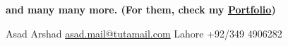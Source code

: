 \documentclass[lighthipster]{simplehipstercv}
\newlength{\rightcolwidth}
\begin{document}
\begin{paracol}{2}
\begin{tabular}{r| p{} c}
\end{tabular}

\begin{center}
    \small
    \textbf{and many many more. (For them, check my \href{https://def-fun7.github.io/Portfolio/}{Portfolio}) }
\end{center}
\vspace{2em}

\setlength{\parindent}{0pt}
\begin{minipage}[t]{\rightcolwidth}
\begin{center}\fontfamily{\sfdefault}\selectfont \color{black!70}
{\small Asad Arshad  \protect\href{mailto:asad.mail!tutamail.com}{asad.mail@tutamail.com}  Lahore  +92/349 4906282 
}
\end{center}
\end{minipage}

\end{paracol}
\end{document}
